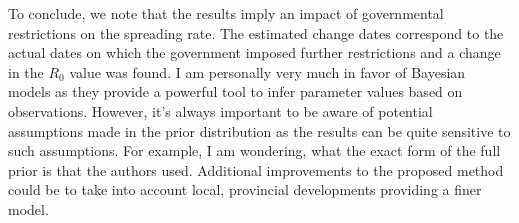 To conclude, we note that the results imply an impact of governmental restrictions on the spreading rate. The estimated change dates correspond to the actual dates on which the government imposed further restrictions and a change in the $R_0$ value was found. I am personally very much in favor of Bayesian models as they provide a powerful tool to infer parameter values based on observations. However, it's always important to be aware of potential assumptions made in the prior distribution as the results can be quite sensitive to such assumptions. For example, I am wondering, what the exact form of the full prior is that the authors used. Additional improvements to the proposed method could be to take into account local, provincial developments providing a finer model.